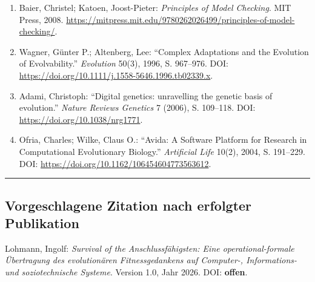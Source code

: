 \documentclass[
  10pt,
  a4paper,
]{article}
\begin{document}
\begin{enumerate}
  Specifications.'' \emph{ACM TOPLAS} 8(2), 1986, S. 244--263. DOI:
  \url{https://doi.org/10.1145/5397.5399}.
\item
  Baier, Christel; Katoen, Joost-Pieter: \emph{Principles of Model
  Checking}. MIT Press, 2008.
  \url{https://mitpress.mit.edu/9780262026499/principles-of-model-checking/}.
\item
  Wagner, Günter P.; Altenberg, Lee: ``Complex Adaptations and the
  Evolution of Evolvability.'' \emph{Evolution} 50(3), 1996, S.
  967--976. DOI:
  \url{https://doi.org/10.1111/j.1558-5646.1996.tb02339.x}.
\item
  Adami, Christoph: ``Digital genetics: unravelling the genetic basis of
  evolution.'' \emph{Nature Reviews Genetics} 7 (2006), S. 109--118.
  DOI: \url{https://doi.org/10.1038/nrg1771}.
\item
  Ofria, Charles; Wilke, Claus O.: ``Avida: A Software Platform for
  Research in Computational Evolutionary Biology.'' \emph{Artificial
  Life} 10(2), 2004, S. 191--229. DOI:
  \url{https://doi.org/10.1162/106454604773563612}.
\end{enumerate}
\endgroup

\begin{center}\rule{0.5\linewidth}{0.5pt}\end{center}

\hypertarget{vorgeschlagene-zitation-nach-erfolgter-publikation}{%
\subsection{Vorgeschlagene Zitation nach erfolgter
Publikation}\label{vorgeschlagene-zitation-nach-erfolgter-publikation}}

\begingroup
\small
Lohmann, Ingolf: \emph{Survival of the Anschlussfähigsten: Eine
operational-formale Übertragung des evolutionären Fitnessgedankens auf
Computer-, Informations- und soziotechnische Systeme}. Version 1.0, Jahr
2026. DOI: \textbf{offen}.
\endgroup
\end{document}
